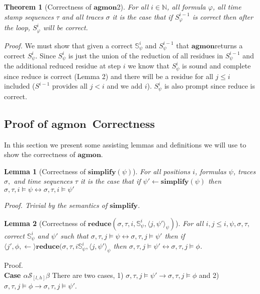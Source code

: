 \documentclass[10pt,a4paper]{article}
\newcommand{\rp}[2]{\ensuremath{\langle #1, #2 \rangle}}
\newcommand{\agmon}{\ensuremath{\mathbf{agmon}}}
\newcommand{\rpt}[3]{\ensuremath{\langle #1, #2 \rangle}_{#3}}
\newtheorem{thm}{Theorem}
\newtheorem{lemma}{Lemma}
\begin{document}
\begin{thm}[Correctness of \agmon 2]
For all $i \in \mathbb{N}$, all formula $\varphi$, all time stamp sequences $\tau$ and all traces $\sigma$ it is the case that if $S^{i-1}_{\varphi}$ is correct then after the loop, $S^{i}_{\varphi}$ will be correct.
\end{thm}
\textit{Proof.} We must show that given a correct $\mathbb{S}^i_{\psi}$ and $S^{i-1}_{\psi}$ that \agmon returns a correct $S^i_{\psi}$. Since $S^i_{\psi}$ is just the union of the reduction of all residues in $S^{i-1}_{\psi}$ and the additional reduced residue at step $i$ we know that $S^i_{\psi}$ is sound and complete since reduce is correct (Lemma 2) and there will be a residue for all $j \leq i$ included ($S^{i-1}$ provides all $j < i$ and we add $i$). $S^i_{\psi}$ is also prompt since reduce is correct.

\subsection{Proof of \agmon\ Correctness}
In this section we present some assisting lemmas and definitions we will use to show the correctness of \agmon.

\begin{lemma}[Correctness of $\mathbf{simplify}(\psi)$] For all positions $i$, formulas $\psi$, traces $\sigma,$ and time sequences $\tau$ 
it is the case that if $\psi' \leftarrow \mathbf{simplify}(\psi)$ then $\sigma, \tau, i \vDash \psi \leftrightarrow \sigma, \tau, i \vDash \psi'$

Proof. Trivial by the semantics of $\mathbf{simplify}$.
\end{lemma}


\begin{lemma}[Correctness of $\mathbf{reduce}(\sigma, \tau, i, \mathbb{S}^i_{\psi}, \rpt{j}{\psi'}{\psi})$]
For all $i, j \leq i, \psi, \sigma, \tau,$ correct $\mathbb{S}^i_{\psi}$ and $\psi'$ such that $\sigma, \tau, j \vDash \psi \leftrightarrow \sigma, \tau, j \vDash \psi'$ then if $\rp{j', \phi} \leftarrow \mathbf{reduce}(\sigma,\tau,i\mathbb{S}^i_{\psi}, \rpt{j}{\psi'}{\psi}$ then $\sigma, \tau, j \vDash \psi' \leftrightarrow \sigma, \tau, j \vDash \phi$.
\end{lemma}

\noindent Proof. \\

\noindent \textbf{Case $\alpha \mathcal{S}_{[l,h]} \beta$}
There are two cases, 1) $\sigma, \tau, j \vDash \psi' \rightarrow \sigma, \tau, j \vDash \phi$ and 2) $\sigma, \tau, j \vDash \phi \rightarrow \sigma, \tau, j \vDash \psi'$.
\end{document}
